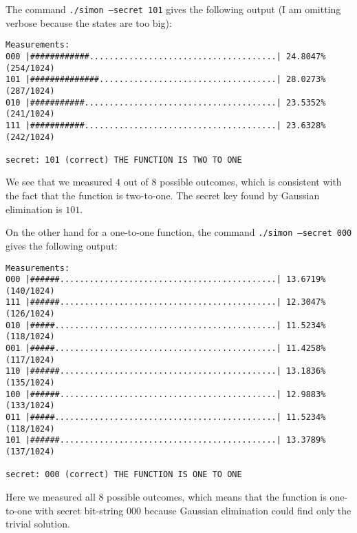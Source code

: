 \documentclass[a4paper,11pt]{article}
\begin{document}
The command \texttt{./simon --secret 101} gives the following output (I am omitting verbose because the states are too big):

\begin{verbatim}
Measurements: 
000 |############......................................| 24.8047% (254/1024)
101 |##############....................................| 28.0273% (287/1024)
010 |###########.......................................| 23.5352% (241/1024)
111 |###########.......................................| 23.6328% (242/1024)

secret: 101 (correct) THE FUNCTION IS TWO TO ONE
\end{verbatim}

We see that we measured $4$ out of $8$ possible outcomes, which is consistent with the fact that the function is two-to-one.
The secret key found by Gaussian elimination is $101$.

On the other hand for a one-to-one function, the command \texttt{./simon --secret 000} gives the following output:
\begin{verbatim}
Measurements: 
000 |######............................................| 13.6719% (140/1024)
111 |######............................................| 12.3047% (126/1024)
010 |#####.............................................| 11.5234% (118/1024)
001 |#####.............................................| 11.4258% (117/1024)
110 |######............................................| 13.1836% (135/1024)
100 |######............................................| 12.9883% (133/1024)
011 |#####.............................................| 11.5234% (118/1024)
101 |######............................................| 13.3789% (137/1024)

secret: 000 (correct) THE FUNCTION IS ONE TO ONE
\end{verbatim}

Here we measured all $8$ possible outcomes, which means that the function is one-to-one with secret bit-string $000$ because Gaussian elimination could find only the trivial solution.
\end{document}
